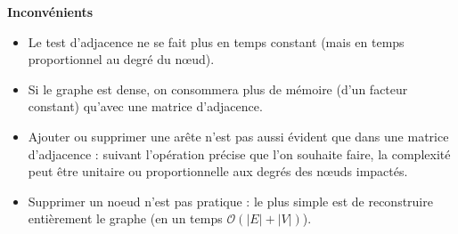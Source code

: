 \textbf{Inconvénients}
\begin{itemize}
\item Le test d’adjacence ne se fait plus en temps constant (mais en temps proportionnel au degré du
nœud).
\item Si le graphe est dense, on consommera plus de mémoire (d’un facteur constant) qu’avec une matrice
d’adjacence.
\item Ajouter ou supprimer une arête n’est pas aussi évident que dans une matrice d’adjacence : suivant
l’opération précise que l’on souhaite faire, la complexité peut être unitaire ou proportionnelle aux
degrés des nœuds impactés.
\item  Supprimer un noeud n’est pas pratique : le plus simple est de reconstruire entièrement le graphe (en
un temps $\mathcal{O}\left(|E| + |V|\right)$).
\end{itemize}



